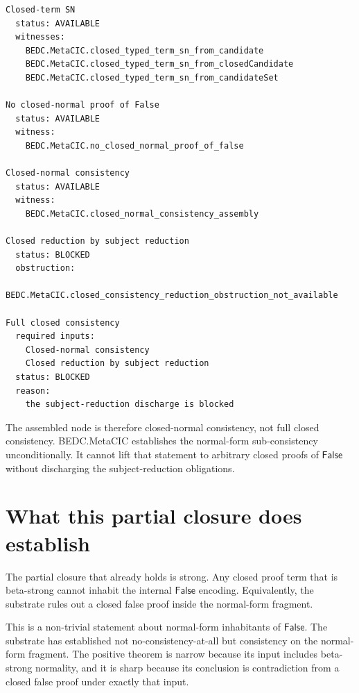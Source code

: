 \begin{verbatim}
Closed-term SN
  status: AVAILABLE
  witnesses:
    BEDC.MetaCIC.closed_typed_term_sn_from_candidate
    BEDC.MetaCIC.closed_typed_term_sn_from_closedCandidate
    BEDC.MetaCIC.closed_typed_term_sn_from_candidateSet

No closed-normal proof of False
  status: AVAILABLE
  witness:
    BEDC.MetaCIC.no_closed_normal_proof_of_false

Closed-normal consistency
  status: AVAILABLE
  witness:
    BEDC.MetaCIC.closed_normal_consistency_assembly

Closed reduction by subject reduction
  status: BLOCKED
  obstruction:
    BEDC.MetaCIC.closed_consistency_reduction_obstruction_not_available

Full closed consistency
  required inputs:
    Closed-normal consistency
    Closed reduction by subject reduction
  status: BLOCKED
  reason:
    the subject-reduction discharge is blocked
\end{verbatim}

The assembled node is therefore closed-normal consistency, not full closed
consistency. BEDC.MetaCIC establishes the normal-form sub-consistency
unconditionally. It cannot lift that statement to arbitrary closed proofs of
$\mathsf{False}$ without discharging the subject-reduction obligations.


\section{What this partial closure does establish}
\label{sec:closed-metacic-consistency-assembly-establishes}

The partial closure that already holds is strong. Any closed proof term that is
beta-strong cannot inhabit the internal $\mathsf{False}$ encoding. Equivalently,
the substrate rules out a closed false proof inside the normal-form fragment.

This is a non-trivial statement about normal-form inhabitants of
$\mathsf{False}$. The substrate has established not no-consistency-at-all but
consistency on the normal-form fragment. The positive theorem is narrow because
its input includes beta-strong normality, and it is sharp because its conclusion
is contradiction from a closed false proof under exactly that input.

